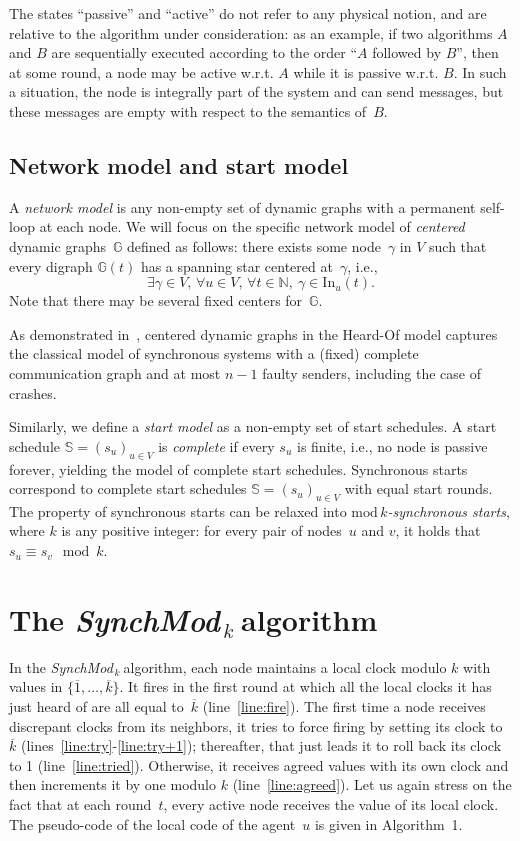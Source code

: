 \documentclass{article}
\newcommand{\cent}{\gamma}
\newcommand{\dG}{\mathds{G}}
\newcommand{\IS}{\mathds{S}}
\newcommand{\In}{\mathrm{In}}
\newcommand{\SM}{{\em SynchMod}$_{\,k}\ $}
\begin{document}
The states ``passive'' and ``active'' do not refer to any physical notion, and are relative to the algorithm under consideration:
	as an example, if two algorithms $A$ and $B$ are sequentially executed according to the order ``$A$ followed by $B$'',
	then at some round, a node may be active w.r.t. $A$ while it is passive w.r.t. $B$.
In such a situation, the node  is integrally part of the system and can send messages, but  these messages are empty 
	with respect to the semantics of~$B$.
	
\subsection{Network model and start model}

A \emph{network model} is any non-empty set of dynamic graphs with a permanent self-loop at each node.
We will focus on the specific network model of \emph{centered} dynamic graphs~$\dG$ defined as follows: 
	there exists some node~$\cent$ in $V$ such that every digraph $\dG(t)$ has a spanning star centered 
	at~$\cent$, i.e., 
	$$\exists \cent \in V, \, \forall u \in V, \, \forall t \in \mathds{N}, \ \cent \in \In_u(t) .$$
Note that there may be several fixed centers for~$\dG$.

As demonstrated in~\cite{model_ho}, centered dynamic graphs in the Heard-Of model captures the
	classical model of synchronous systems with a (fixed) complete communication graph and 
	 at most $n-1$ faulty senders, including the case of crashes.

Similarly, we define a \emph{start model} as a non-empty set of start schedules.
A start schedule $\IS = (s_u)_{u\in V}$ is \emph{complete} if every $s_u$ is finite, i.e.,
	no node is passive forever, yielding the model of complete start schedules.
Synchronous starts correspond to complete start schedules $\IS = (s_u)_{u\in V}$ with
	equal start rounds.	
The property of synchronous starts can be relaxed into \emph{$\mathrm{mod}\,k$-synchronous starts},
	where $k$ is any positive integer: for every pair of nodes~$u$ and $v$, it holds that $s_u \equiv s_v \!\mod k$.

\section{The \SM algorithm}

In the \SM algorithm, each node  maintains a local clock modulo $k$ with values in $\{ \overline{1}, \dots,  \overline{k} \}$.
It fires in the first round at which all the local clocks it has just heard of  are all equal to~$\overline{k} $ (line~\ref{line:fire}).
The first time a node receives discrepant clocks from its neighbors, it tries to force firing  by setting its clock to  $\overline{k} $
	(lines~\ref{line:try}-\ref{line:try+1});
	thereafter, that  just leads it to roll back its clock to 1 (line~\ref{line:tried}).
Otherwise, it receives agreed values with its own clock and then increments it by one modulo $k$ (line~\ref{line:agreed}).
Let us again stress on the fact that at each round~$t$, every active node receives the value of its local clock.
The pseudo-code of the local code of the agent~$u$ is given in Algorithm~1.
\end{document}
